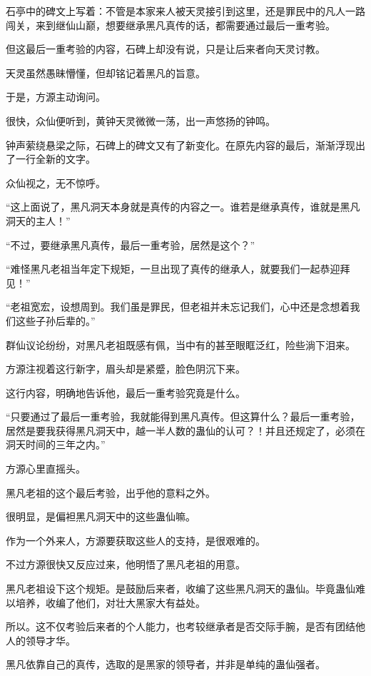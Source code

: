 
\begin{this_body}

石亭中的碑文上写着：不管是本家来人被天灵接引到这里，还是罪民中的凡人一路闯关，来到继仙山巅，想要继承黑凡真传的话，都需要通过最后一重考验。

但这最后一重考验的内容，石碑上却没有说，只是让后来者向天灵讨教。

天灵虽然愚昧懵懂，但却铭记着黑凡的旨意。

于是，方源主动询问。

很快，众仙便听到，黄钟天灵微微一荡，出一声悠扬的钟鸣。

钟声萦绕悬梁之际，石碑上的碑文又有了新变化。在原先内容的最后，渐渐浮现出了一行全新的文字。

众仙视之，无不惊呼。

“这上面说了，黑凡洞天本身就是真传的内容之一。谁若是继承真传，谁就是黑凡洞天的主人！”

“不过，要继承黑凡真传，最后一重考验，居然是这个？”

“难怪黑凡老祖当年定下规矩，一旦出现了真传的继承人，就要我们一起恭迎拜见！”

“老祖宽宏，设想周到。我们虽是罪民，但老祖并未忘记我们，心中还是念想着我们这些子孙后辈的。”

群仙议论纷纷，对黑凡老祖既感有佩，当中有的甚至眼眶泛红，险些淌下泪来。

方源注视着这行新字，眉头却是紧蹙，脸色阴沉下来。

这行内容，明确地告诉他，最后一重考验究竟是什么。

“只要通过了最后一重考验，我就能得到黑凡真传。但这算什么？最后一重考验，居然是要我获得黑凡洞天中，越一半人数的蛊仙的认可？！并且还规定了，必须在洞天时间的三年之内。”

方源心里直摇头。

黑凡老祖的这个最后考验，出乎他的意料之外。

很明显，是偏袒黑凡洞天中的这些蛊仙嘛。

作为一个外来人，方源要获取这些人的支持，是很艰难的。

不过方源很快又反应过来，他明悟了黑凡老祖的用意。

黑凡老祖设下这个规矩。是鼓励后来者，收编了这些黑凡洞天的蛊仙。毕竟蛊仙难以培养，收编了他们，对壮大黑家大有益处。

所以。这不仅考验后来者的个人能力，也考较继承者是否交际手腕，是否有团结他人的领导才华。

黑凡依靠自己的真传，选取的是黑家的领导者，并非是单纯的蛊仙强者。


\end{this_body}
